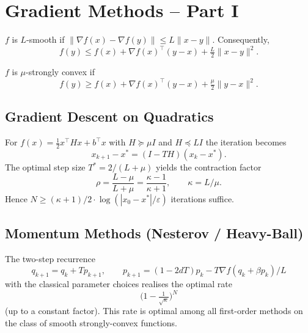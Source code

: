 \section{Gradient Methods – Part I}

\begin{definition}[Smoothness]
  \(f\) is \(L\)-smooth if \(\|\nabla f(x)-\nabla f(y)\|\le L\|x-y\|\).
  Consequently,
  \[
    f(y)\le f(x)+\nabla f(x)^\top(y-x)+\tfrac L2\|x-y\|^2.
  \]
\end{definition}

\begin{definition}
  \(f\) is \(\mu\)-strongly convex if
  \[
    f(y)\ge f(x)+\nabla f(x)^\top(y-x)+\tfrac\mu2\|y-x\|^2.
  \]
\end{definition}

\subsection{Gradient Descent on Quadratics}
For \(f(x)=\frac12 x^\top Hx+b^\top x\) with \(H\succeq\mu I\) and
\(H\preceq L I\) the iteration becomes
\[
  x_{k+1}-x^*=(I-TH)(x_k-x^*).
\]
The optimal step size \(T^*=2/(L+\mu)\) yields the contraction factor
\[
  \rho=\frac{L-\mu}{L+\mu}=\frac{\kappa-1}{\kappa+1},\qquad\kappa=L/\mu.
\]
Hence \(N\ge(\kappa+1)/2\cdot\log(|x_0-x^*|/\varepsilon)\) iterations suffice.

\subsection{Momentum Methods (Nesterov / Heavy-Ball)}
The two-step recurrence
\[
  q_{k+1}=q_k+Tp_{k+1},\qquad p_{k+1}=(1-2dT)p_k-T\nabla f(q_k+\beta p_k)/L
\]
with the classical parameter choices realises the optimal rate
\[
  \bigl(1-\tfrac1{\sqrt\kappa}\bigr)^N
\]
(up to a constant factor). This rate is optimal among all first-order
methods on the class of smooth strongly-convex functions.

